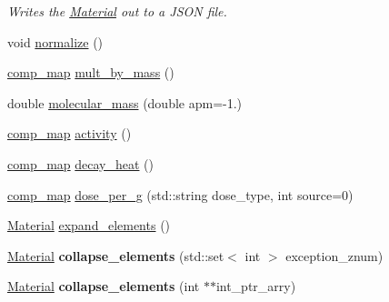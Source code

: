 \begin{DoxyCompactItemize}
\begin{DoxyCompactList}\small\item\em Writes the \hyperlink{classpyne_1_1_material}{Material} out to a J\+S\+ON file. \end{DoxyCompactList}\item 
void \hyperlink{classpyne_1_1_material_ad27e37568bc08020d3886bb6284bc61d}{normalize} ()
\item 
\hyperlink{namespacepyne_a86738cecccf4ce3f4ecc2ff6f45ce1a2}{comp\+\_\+map} \hyperlink{classpyne_1_1_material_ad561ad2e529cbdcc0c73b10b067289fd}{mult\+\_\+by\+\_\+mass} ()
\item 
double \hyperlink{classpyne_1_1_material_a5adf1c262bbabfadf5a8491e7a434ae5}{molecular\+\_\+mass} (double apm=-\/1.)
\item 
\hyperlink{namespacepyne_a86738cecccf4ce3f4ecc2ff6f45ce1a2}{comp\+\_\+map} \hyperlink{classpyne_1_1_material_aae4cbb00f956e2b89fc30ec65124408e}{activity} ()
\item 
\hyperlink{namespacepyne_a86738cecccf4ce3f4ecc2ff6f45ce1a2}{comp\+\_\+map} \hyperlink{classpyne_1_1_material_afa2f1337b64376c13bcece406bbc70f1}{decay\+\_\+heat} ()
\item 
\hyperlink{namespacepyne_a86738cecccf4ce3f4ecc2ff6f45ce1a2}{comp\+\_\+map} \hyperlink{classpyne_1_1_material_a8a55933dccd966f7f3e29d21043bb0d5}{dose\+\_\+per\+\_\+g} (std\+::string dose\+\_\+type, int source=0)
\item 
\hyperlink{classpyne_1_1_material}{Material} \hyperlink{classpyne_1_1_material_a1013d4217c99935396a5f3bc74722bd1}{expand\+\_\+elements} ()
\item 
\hyperlink{classpyne_1_1_material}{Material} {\bfseries collapse\+\_\+elements} (std\+::set$<$ int $>$ exception\+\_\+znum)\hypertarget{classpyne_1_1_material_a87cce5b3c63e3f74c3193db856727a8c}{}\label{classpyne_1_1_material_a87cce5b3c63e3f74c3193db856727a8c}

\item 
\hyperlink{classpyne_1_1_material}{Material} {\bfseries collapse\+\_\+elements} (int $\ast$$\ast$int\+\_\+ptr\+\_\+arry)\hypertarget{classpyne_1_1_material_a58a9f43215bc0c4b826e234b2959a941}{}\label{classpyne_1_1_material_a58a9f43215bc0c4b826e234b2959a941}


\end{DoxyCompactItemize}
